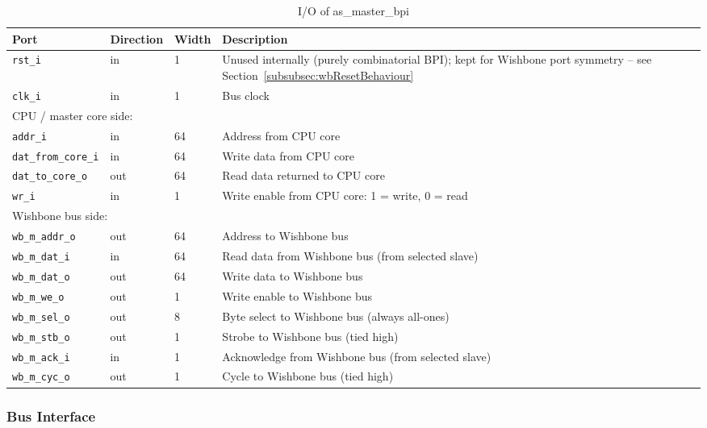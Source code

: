 \begin{table}[H]
\caption{I/O of as\_master\_bpi}
\label{tab:asMasterBpiIO}
\centering
\begin{tabularx}{\textwidth}{|l |l |l |X|}
  \hline
  Port & Direction & Width & Description \\
  \hline
  \hline
  \texttt{rst\_i}             & in  & 1  & Unused internally (purely combinatorial BPI); kept for Wishbone port symmetry -- see Section~\ref{subsubsec:wbResetBehaviour} \\
  \hline
  \texttt{clk\_i}             & in  & 1  & Bus clock \\
  \hline
  \multicolumn{4}{|l|}{CPU / master core side:} \\
  \hline
  \texttt{addr\_i}            & in  & 64 & Address from CPU core \\
  \hline
  \texttt{dat\_from\_core\_i} & in  & 64 & Write data from CPU core \\
  \hline
  \texttt{dat\_to\_core\_o}   & out & 64 & Read data returned to CPU core \\
  \hline
  \texttt{wr\_i}              & in  & 1  & Write enable from CPU core: 1 = write, 0 = read \\
  \hline
  \multicolumn{4}{|l|}{Wishbone bus side:} \\
  \hline
  \texttt{wb\_m\_addr\_o}     & out & 64 & Address to Wishbone bus \\
  \hline
  \texttt{wb\_m\_dat\_i}      & in  & 64 & Read data from Wishbone bus (from selected slave) \\
  \hline
  \texttt{wb\_m\_dat\_o}      & out & 64 & Write data to Wishbone bus \\
  \hline
  \texttt{wb\_m\_we\_o}       & out & 1  & Write enable to Wishbone bus \\
  \hline
  \texttt{wb\_m\_sel\_o}      & out & 8  & Byte select to Wishbone bus (always all-ones) \\
  \hline
  \texttt{wb\_m\_stb\_o}      & out & 1  & Strobe to Wishbone bus (tied high) \\
  \hline
  \texttt{wb\_m\_ack\_i}      & in  & 1  & Acknowledge from Wishbone bus (from selected slave) \\
  \hline
  \texttt{wb\_m\_cyc\_o}      & out & 1  & Cycle to Wishbone bus (tied high) \\
  \hline
\end{tabularx}
\end{table}

\subsubsection{Bus Interface}

